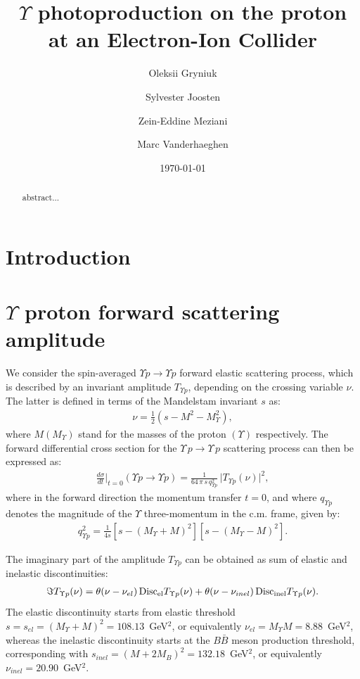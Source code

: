 \documentclass[10pt,prd,aps,nofootinbib,superscriptaddress]{revtex4}
\newcommand{\bea}{\begin{eqnarray}}
\newcommand{\eea}{\end{eqnarray}}
\begin{document}
\title{$\Upsilon$ photoproduction on the proton at an Electron-Ion Collider}
\author{Oleksii Gryniuk}
\author{Sylvester Joosten}
\author{Zein-Eddine Meziani}
\author{Marc Vanderhaeghen}
\noaffiliation
\date{\today}

\begin{abstract}
abstract...
\end{abstract}

\maketitle

\tableofcontents


\section{Introduction}

\newpage

\section{$\Upsilon$ proton forward scattering amplitude}

We consider the spin-averaged $\Upsilon p \to \Upsilon p$ forward elastic scattering process, which is described by an invariant amplitude $T_{\Upsilon p}$, depending on the crossing variable $\nu$. The latter is defined in terms of the Mandelstam invariant $s$ as:
\bea
\nu = \frac{1}{2} (s - M^2 - M_\Upsilon^2),
\eea
where $M (M_\Upsilon)$ stand for the masses of the proton $(\Upsilon)$ respectively.  
The forward differential cross section for the $\Upsilon \, p \to \Upsilon \, p$ scattering process can then be expressed as:
\bea
\frac{d \sigma}{dt} \biggr|_{t = 0} (\Upsilon p \to \Upsilon p) = \frac{1}{64 \, \pi \, s \, q_{\Upsilon p}^2} \, \big| T_{\Upsilon p}(\nu) \big|^2,
\eea
where in the forward direction the momentum transfer $t = 0$, and where $q_{\Upsilon p}$ denotes the magnitude of the $\Upsilon$ three-momentum in the c.m. frame, given by:
 \bea 
 q_{\Upsilon p}^2  = \frac{1}{4 s} \left[ s - (M_\Upsilon + M)^2 \right] \left[ s - (M_\Upsilon - M)^2 \right].
 \eea 
 
The imaginary part of the amplitude $T_{\Upsilon p}$ can be obtained as sum of elastic and inelastic discontinuities:
\bea
\Im T_{\Upsilon p}(\nu)  = \theta(\nu - \nu_{el}) \,  {\rm Disc}_{\rm el} T_{\Upsilon p}(\nu) +   \theta(\nu - \nu_{inel}) \,  {\rm Disc}_{\rm inel} T_{\Upsilon p}(\nu).
\label{eq:disctot}
\eea
The elastic discontinuity starts from elastic threshold $s = s_{el} = (M_\Upsilon + M)^2 = 108.13$~GeV$^2$, or equivalently $\nu_{el} = M_\Upsilon M = 8.88$~GeV$^2$, whereas the inelastic discontinuity 
starts at the $B \bar B$ meson production threshold, corresponding with $s_{inel} = (M + 2 M_B)^2 = 132.18$~GeV$^2$, or equivalently $\nu_{inel} = 20.90$~GeV$^2$. 
\end{document}
